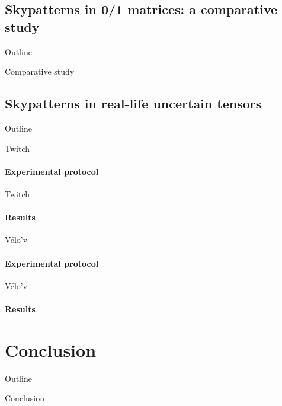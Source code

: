 \documentclass{beamer}
\begin{document}
\subsection{Skypatterns in 0/1 matrices: a comparative study}
\begin{frame}{Outline}
  \tableofcontents[currentsubsection]
\end{frame}

\begin{frame}{Comparative study}

\end{frame}


\subsection{Skypatterns in real-life uncertain tensors}
\begin{frame}{Outline}
  \tableofcontents[currentsubsection]
\end{frame}

\begin{frame}{Twitch}
  \framesubtitle{Experimental protocol}

\end{frame}

\begin{frame}{Twitch}
  \framesubtitle{Results}

\end{frame}


\begin{frame}{Vélo'v}
  \framesubtitle{Experimental protocol}
  
\end{frame}

\begin{frame}{Vélo'v}
  \framesubtitle{Results}
  
\end{frame}


\section{Conclusion}
\begin{frame}{Outline}
  \tableofcontents[currentsection]
\end{frame}

\begin{frame}{Conclusion}

\end{frame}


\end{document}
